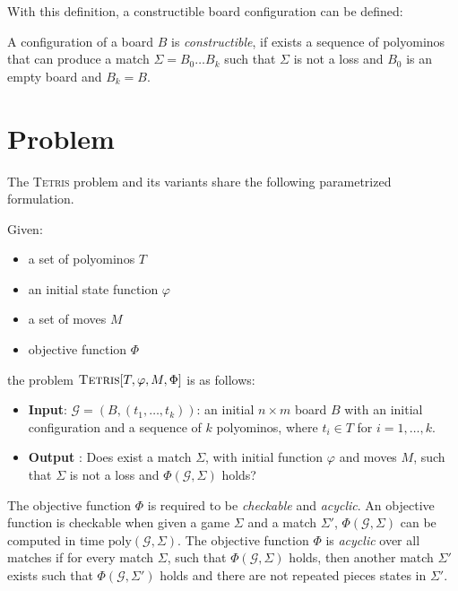 With this definition, a constructible board configuration can be defined:

\begin{definition}
  A configuration of a board $B$ is \emph{constructible}, if exists a sequence of polyominos that can produce a match $\Sigma = B_0 \dots B_k$ such that $\Sigma$ is not a loss and $B_0$ is an empty board and $B_k = B$. 
\end{definition}

\section{Problem}

The \textsc{Tetris} problem and its variants share the following parametrized formulation.
\begin{definition} 
  Given: 
  \begin{itemize}
    \item a set of polyominos $T$
    \item an initial state function $\varphi$
    \item a set of moves $ M $
    \item objective function $\Phi$
  \end{itemize}
    the problem $\textsc{Tetris}[T,\varphi,M,\Phi]$ is as follows:
  
  \begin{itemize}
    \item \textbf{Input}: $\mathcal{G} = (B,(t_1,\dots,t_k))$: an initial $n\times m$ board $B$ with an initial configuration and a sequence of $k$ polyominos, where $t_i \in T$ for $i = 1,\dots,k$.
    
    \item \textbf{Output} : Does exist a match $\Sigma$, with initial function $\varphi$ and moves $M$, such that $\Sigma$ is not a loss and  $\Phi ( \mathcal{G}, \Sigma )$ holds? 
  \end{itemize}


\end{definition}

The objective function $\Phi$ is required to be \emph{checkable} and \emph{acyclic}. An objective function is checkable when given a game $\Sigma$ and a match $\Sigma'$, $\Phi(\mathcal{G},\Sigma)$ can be computed in time $\text{poly}(\mathcal{G},\Sigma)$. The objective function $\Phi$ is \emph{acyclic} over all matches if for every match $\Sigma$, such that $\Phi(\mathcal{G}, \Sigma)$ holds, then another match $\Sigma'$ exists such that  $\Phi(\mathcal{G},\Sigma')$ holds and there are not repeated pieces states in $\Sigma'$.

